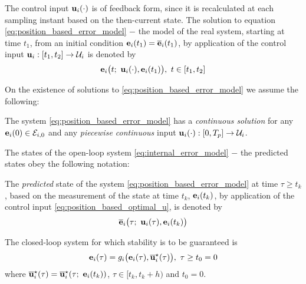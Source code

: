 The control input $\bm{\mathbf{u}}_i(\cdot)$ is of feedback form,
since it is recalculated at each sampling instant based on the then-current
state. The solution to equation \eqref{eq:position_based_error_model} $-$ the
model of the real system, starting at time $t_1$, from an initial condition
$\bm{\mathbf{e}}_i(t_1) = \overline{\bm{\mathbf{e}}}_i(t_1)$,
by application of the control input $\bm{\mathbf{u}}_i : [t_1, t_2] \to \mathcal{U}_i$
is denoted by
\begin{align}
  \bm{\mathbf{e}}_i\big(t;\ \bm{\mathbf{u}}_i(\cdot), \bm{\mathbf{e}}_i(t_1)\big),\ t \in [t_1, t_2]
\end{align}


On the existence of solutions to \eqref{eq:position_based_error_model} we
assume the following:\\[1ex]
\begin{bw_box}
\begin{assumption}
  \label{ass:existence_of_solutions_without_disturbance}

  The system \eqref{eq:position_based_error_model} has a
  \textit{continuous solution} for any $\bm{\mathbf{e}}_i(0) \in \mathcal{E}_{i,0}$ and
  any \textit{piecewise continuous} input
  $\bm{\mathbf{u}}_i(\cdot) :[0,T_p] \to \mathcal{U}_i$.
\end{assumption}
\end{bw_box}

The states of the open-loop system \eqref{eq:internal_error_model} $-$ the
predicted states obey the following notation:\\[1ex]
\begin{bw_box}
\begin{remark}
The \textit{predicted} state of the system \eqref{eq:position_based_error_model}
at time $\tau \geq t_k$ , based on the measurement of the state at time
$t_k$, $\bm{\mathbf{e}}_i(t_k)$, by application of the control input
\eqref{eq:position_based_optimal_u}, is denoted by
\begin{align}
  \overline{\bm{\mathbf{e}}}_i\big(\tau;\ \bm{\mathbf{u}}_i(\tau), \bm{\mathbf{e}}_i(t_k)\big) \label{eq:position_based_predicted_error_0}
\end{align}
\end{remark}
\end{bw_box}

The closed-loop system for which stability is to be guaranteed is
\begin{align}
  \bm{\mathbf{e}}_i(\tau) = g_i\big(\bm{\mathbf{e}}_i(\tau), \overline{\bm{\mathbf{u}}}_i^{\star}(\tau)\big),\ \tau \geq t_0 = 0
  \label{eq:without_disturbances_closed_loop}
\end{align}
where $\overline{\bm{\mathbf{u}}}_i^{\star}(\tau) = \overline{\bm{\mathbf{u}}}_i^{\star}(\tau;\ \bm{\mathbf{e}}_i(t_k))$,
$\tau \in [t_k, t_k + h)$ and $t_0 = 0$.


